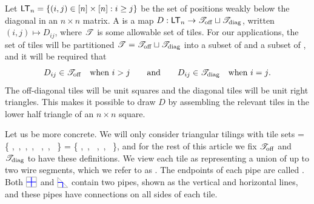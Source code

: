 \documentclass[10pt]{article}
\begin{document}
 Let $\mathsf{LT}_n = \{ (i,j) \in [n] \times [n] : i \geq j\}$ be the set of positions weakly below the diagonal in an $n\times n$ matrix.
A  is a map $D : \mathsf{LT}_n \to  \mathscr{T}_{\mathrm{off}}\sqcup \mathscr{T}_{\mathrm{diag}}$, written $(i,j)\mapsto D_{ij}$,
where $\mathscr{T}$ is some allowable set of tiles.
For our applications, the set of tiles will be partitioned $\mathscr{T} = \mathscr{T}_{\mathrm{off}}\sqcup \mathscr{T}_{\mathrm{diag}}$
into a subset of  and a subset of , and it will be required 
that 
\[D_{ij} \in \mathscr{T}_{\mathrm{off}}\quad\text{when $i>j$}
\qquad\text{and}\qquad
 D_{ij} \in \mathscr{T}_{\mathrm{diag}}\quad\text{when $i=j$.}
 \]
 The off-diagonal tiles will be unit squares and the diagonal tiles will be unit right triangles.
This makes it possible to draw $D$ by assembling the relevant tiles in
the lower half triangle of an $n\times n$ square.  

Let us be more concrete. 
We will only consider  triangular tilings
with tile sets
\be\label{TPD-eq}
\cToff = \Bigl\{
\BTILE,\
\HTILE,\
\VTILE,\
\JTILE, \
\CTILE,\ 
\PTILE,\
\ETILE
\Bigr\}
\quand
\cTdiag = \Bigl\{
\BDIAG,\
\JDIAG, \
\CDIAG,\ 
\PDIAG,\
\EDIAG
\Bigr\},
\ee
and for the rest of this article we fix $\mathscr{T}_{\mathrm{off}}$ and $\mathscr{T}_{\mathrm{diag}}$ to have these definitions.
We view each tile as representing a union of up to two wire segments,
which we refer to as .
The endpoints of each pipe are called .
%
Both $\PTILE$ and $\PDIAG$ contain two pipes, shown as the vertical and horizontal lines,
and these pipes have connections on all sides of each tile.
\end{document}
